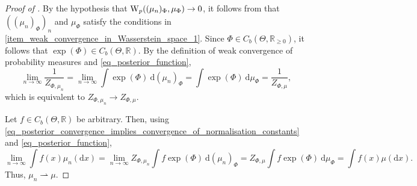 \documentclass[a4paper]{scrartcl}
\theoremstyle{definition}
\numberwithin{equation}{section}
\newcommand{\R}{\mathbb{R}}
\newcommand{\rd}{\mathrm{d}}
\newcommand{\Was}[0]{\textup{W}}
\begin{document}
\LemmaWassersteinContinuityPosteriorToPriorMap*
\begin{proof}[Proof of ]
By the hypothesis that $\Was_p((\mu_n)_\Phi,\mu_{\Phi})\to 0$, it follows from \cite[Theorem 6.9]{Villani2009} that $((\mu_n)_\Phi)_n$ and $\mu_\Phi$ satisfy the conditions in \ref{item_weak_convergence_in_Wasserstein_space_1}.
Since $\Phi\in C_b(\Theta,\R_{\geq 0})$, it follows that $\exp(\Phi)\in C_b(\Theta,\R)$. By the definition of weak convergence of probability measures and \eqref{eq_posterior_function},
\begin{equation}\label{eq_posterior_convergence_implies_convergence_of_normalisation_constants}
\lim_{n\to\infty}\frac{1}{Z_{\Phi,\mu_n}}=\lim_{n\to \infty} \int \exp(\Phi)~\rd(\mu_n)_\Phi = \int \exp(\Phi)~\rd\mu_{\Phi}=\frac{1}{Z_{\Phi,\mu}},
\end{equation}  
which is equivalent to $Z_{\Phi,\mu_n} \to Z_{\Phi,\mu}$.

Let $f\in C_b(\Theta,\R)$ be arbitrary. Then, using \eqref{eq_posterior_convergence_implies_convergence_of_normalisation_constants} and \eqref{eq_posterior_function},
\begin{equation*}
\lim_{n\to \infty} \int f(x)\mu_n(\rd x) = \lim_{n\to \infty} Z_{\Phi,\mu_n} \int  f \exp(\Phi)~\rd(\mu_n)_\Phi = Z_{\Phi,\mu} \int  f\exp(\Phi)~\rd\mu_{\Phi}= \int  f(x)\mu(\rd x).
\end{equation*}
Thus, $\mu_n\rightharpoonup\mu$.


\end{proof}
\end{document}

